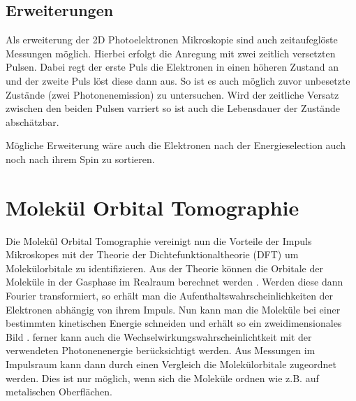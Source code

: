         \subsection{Erweiterungen}
            Als erweiterung der 2D Photoelektronen Mikroskopie sind auch zeitaufeglöste Messungen möglich.
            Hierbei erfolgt die Anregung mit zwei zeitlich versetzten Pulsen. 
            Dabei regt der erste Puls die Elektronen in einen höheren Zustand an und der zweite Puls löst diese dann aus.
            So ist es auch möglich zuvor unbesetzte Zustände (zwei Photonenemission) zu untersuchen.
            Wird der zeitliche Versatz zwischen den beiden Pulsen varriert so ist auch die Lebensdauer der Zustände abschätzbar.

            Mögliche Erweiterung wäre auch die Elektronen nach der Energieselection auch noch nach ihrem Spin zu sortieren.
        

    \section{Molekül Orbital Tomographie} \label{sec:MOT}
        Die Molekül Orbital Tomographie vereinigt nun die Vorteile der Impuls Mikroskopes mit der Theorie der Dichtefunktionaltheorie (DFT) um Molekülorbitale zu identifizieren.
        Aus der Theorie können die Orbitale der Moleküle in der Gasphase im Realraum berechnet werden \cite{database}.
        Werden diese dann Fourier transformiert, so erhält man die Aufenthaltswahrscheinlichkeiten der Elektronen abhängig von ihrem Impuls.
        Nun kann man die Moleküle bei einer bestimmten kinetischen Energie schneiden und erhält so ein zweidimensionales Bild \cite{brandstetter_kmappy_2021}.
        ferner kann auch die Wechselwirkungswahrscheinlichtkeit mit der verwendeten Photonenenergie berücksichtigt werden.
        Aus Messungen im Impulsraum kann dann durch einen Vergleich die Molekülorbitale zugeordnet werden.
        Dies ist nur möglich, wenn sich die Moleküle ordnen wie z.B. auf metalischen Oberflächen.

